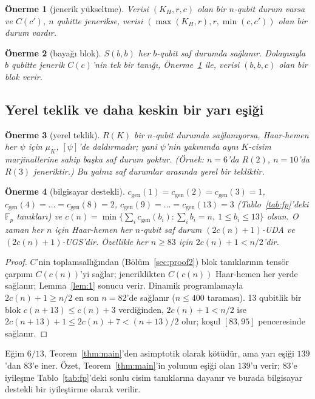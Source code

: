 \documentclass[aps,pra,onecolumn,superscriptaddress,nofootinbib,longbibliography,10pt]{revtex4-2}
\newtheorem{proposition}{Önerme}[section]
\theoremstyle{definition}
\newcommand{\FF}{\mathbb F}
\newcommand{\cgen}{c_{\mathrm{gen}}}
\begin{document}
\begin{proposition}[jenerik yükseltme]\label{prop:upgrade}
Verisi $(K_H,r,c)$ olan bir $n$-qubit durum varsa ve $C(c')$, $n$ qubitte jenerikse, verisi $(\max(K_H,r),r,\min(c,c'))$ olan bir durum vardır.
\end{proposition}
\begin{proposition}[bayağı blok]\label{prop:triv}
$S(b,b)$ her $b$-qubit saf durumda sağlanır. Dolayısıyla $b$ qubitte jenerik $C(c)$'nin tek bir tanığı, Önerme~\ref{prop:upgrade} ile, verisi $(b,b,c)$ olan bir blok verir.
\end{proposition}

\subsection{Yerel teklik ve daha keskin bir yarı eşiği}
\begin{proposition}[yerel teklik]\label{prop:loc}
$R(K)$ bir $n$-qubit durumda sağlanıyorsa, Haar-hemen her $\psi$ için $\mu_K$, $[\psi]$'de daldırmadır; yani $\psi$'nin yakınında aynı $K$-cisim marjinallerine sahip başka saf durum yoktur. (Örnek: $n=6$'da $R(2)$, $n=10$'da $R(3)$ jeneriktir.) Bu yalnız saf durumlar arasında yerel bir tekliktir.
\end{proposition}

\begin{proposition}[bilgisayar destekli]\label{prop:83}
$\cgen(1)=\cgen(2)=\cgen(3)=1$, $\cgen(4)=\dots=\cgen(8)=2$, $\cgen(9)=\dots=\cgen(13)=3$ (Tablo~\ref{tab:fp}'deki $\FF_p$ tanıkları) ve
$c(n)=\min\{\sum_i\cgen(b_i):\sum_ib_i=n,\ 1\le b_i\le13\}$ olsun. O zaman her $n$ için Haar-hemen her $n$-qubit saf durum $(2c(n)+1)$-UDA ve $(2c(n)+1)$-UGS'dir. Özellikle her $n\ge83$ için $2c(n)+1<n/2$'dir.
\end{proposition}
\begin{proof}
$C$'nin toplamsallığından (Bölüm~\ref{sec:proof2}) blok tanıklarının tensör çarpımı $C(c(n))$'yi sağlar; jeneriklikten $C(c(n))$ Haar-hemen her yerde sağlanır; Lemma~\ref{lem:1} sonucu verir. Dinamik programlamayla $2c(n)+1\ge n/2$ en son $n=82$'de sağlanır ($n\le400$ taraması). 13 qubitlik bir blok $c(n+13)\le c(n)+3$ verdiğinden, $2c(n)+1<n/2$ ise $2c(n+13)+1\le2c(n)+7<(n+13)/2$ olur; koşul $[83, 95]$ penceresinde sağlanır.
\end{proof}
\noindent Eğim $6/13$, Teorem~\ref{thm:main}'den asimptotik olarak kötüdür, ama yarı eşiği $139$'dan $83$'e iner. Özet, Teorem~\ref{thm:main}'in yolunun eşiği olan $139$'u verir; $83$'e iyileşme Tablo~\ref{tab:fp}'deki sonlu cisim tanıklarına dayanır ve burada bilgisayar destekli bir iyileştirme olarak verilir.
\end{document}
